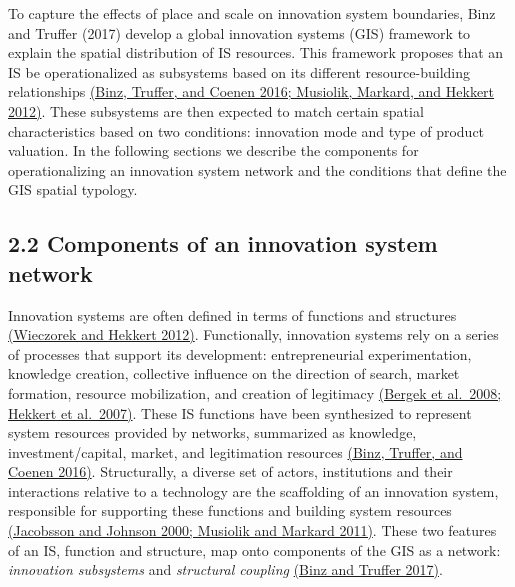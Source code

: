 \documentclass[twoside,12pt,final]{ucthesis-CA2012}
\begin{document}
\begin{ucmainmatter}
To capture the effects of place and scale on innovation system
boundaries, Binz and Truffer (2017) develop a \textquotesingle global innovation
systems\textquotesingle{} (GIS) framework to explain the spatial distribution of IS
resources. This framework proposes that an IS be operationalized as
subsystems based on its different resource-building relationships
\href{https://www.zotero.org/google-docs/?NihzG7}{(Binz, Truffer, and Coenen 2016; Musiolik, Markard, and Hekkert
2012)}. These subsystems are
then expected to match certain spatial characteristics based on two
conditions: innovation mode and type of product valuation. In the
following sections we describe the components for operationalizing an
innovation system network and the conditions that define the GIS spatial
typology.

\hypertarget{components-of-an-innovation-system-network}{%
\subsection{2.2 Components of an innovation system network}\label{components-of-an-innovation-system-network}}

Innovation systems are often defined in terms of functions and
structures \href{https://www.zotero.org/google-docs/?GVjAK0}{(Wieczorek and Hekkert
2012)}. Functionally,
innovation systems rely on a series of processes that support its
development: entrepreneurial experimentation, knowledge creation,
collective influence on the direction of search, market formation,
resource mobilization, and creation of legitimacy \href{https://www.zotero.org/google-docs/?DiFYKq}{(Bergek et al.~2008;
Hekkert et al.~2007)}. These
IS functions have been synthesized to represent \textquotesingle system resources\textquotesingle{}
provided by networks, summarized as knowledge, investment/capital,
market, and legitimation resources \href{https://www.zotero.org/google-docs/?Sy7y1y}{(Binz, Truffer, and Coenen
2016)}. Structurally, a
diverse set of actors, institutions and their interactions relative to a
technology are the scaffolding of an innovation system, responsible for
supporting these functions and building system resources \href{https://www.zotero.org/google-docs/?RfaBxU}{(Jacobsson and
Johnson 2000; Musiolik and Markard
2011)}. These two features
of an IS, function and structure, map onto components of the GIS as a
network: \emph{innovation subsystems} and \emph{structural coupling} \href{https://www.zotero.org/google-docs/?NUhAxp}{(Binz and
Truffer 2017)}.


\end{ucmainmatter}
\end{document}
